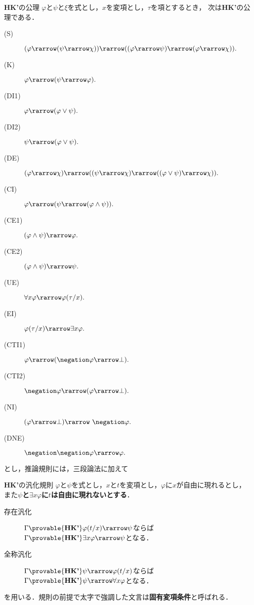 	\begin{itembox}[l]{{\bf HK'}の公理}
		$\varphi$と$\psi$と$\xi$を式とし，$x$を変項とし，$\tau$を項とするとき，
		次は{\bf HK'}の公理である．
		\begin{description}
			\item[(S)] $(\varphi \rarrow (\psi \rarrow \chi)) 
				\rarrow ((\varphi \rarrow \psi)
				\rarrow (\varphi \rarrow \chi)).$
			\item[(K)] $\varphi \rarrow (\psi \rarrow \varphi).$
			\item[(DI1)] $\varphi \rarrow (\varphi \vee \psi).$
			\item[(DI2)] $\psi \rarrow (\varphi \vee \psi).$
			\item[(DE)] $(\varphi \rarrow \chi) \rarrow 
				((\psi \rarrow \chi) \rarrow ((\varphi \vee \psi) \rarrow \chi)).$
			\item[(CI)] $\varphi \rarrow (\psi \rarrow (\varphi \wedge \psi)).$
			\item[(CE1)] $(\varphi \wedge \psi) \rarrow \varphi.$
			\item[(CE2)] $(\varphi \wedge \psi) \rarrow \psi.$
			
			\item[(UE)] $\forall x \varphi \rarrow \varphi(\tau/x).$
			\item[(EI)] $\varphi(\tau/x) \rarrow \exists x \varphi.$
			
			\item[(CTI1)] $\varphi \rarrow (\negation \varphi \rarrow \bot).$
			
			\item[(CTI2)] $\negation \varphi \rarrow (\varphi \rarrow \bot).$
			
			\item[(NI)] $(\varphi \rarrow \bot) \rarrow\ \negation \varphi.$
			\item[(DNE)] $\negation \negation \varphi \rarrow \varphi.$
		\end{description}
	\end{itembox}
	
	とし，推論規則には，三段論法に加えて
	
	\begin{itembox}[l]{{\bf HK'}の汎化規則}
		$\varphi$と$\psi$を式とし，$x$と$t$を変項とし，$\varphi$に$x$が自由に現れるとし，
		また{\bf $\psi$と$\exists x \varphi$に$t$は自由に現れないとする}．
		\begin{description}
			\item[存在汎化] 
				$\Gamma \provable{\mbox{{\bf HK'}}} \varphi(t/x) \rarrow \psi$ならば
				$\Gamma \provable{\mbox{{\bf HK'}}} \exists x \varphi \rarrow \psi$となる．
			
			\item[全称汎化] 
				$\Gamma \provable{\mbox{{\bf HK'}}} \psi \rarrow \varphi(t/x)$ならば
				$\Gamma \provable{\mbox{{\bf HK'}}} \psi \rarrow \forall x \varphi$となる．
		\end{description}
	\end{itembox}
	を用いる．規則の前提で太字で強調した文言は{\bf 固有変項条件}と呼ばれる．
	
